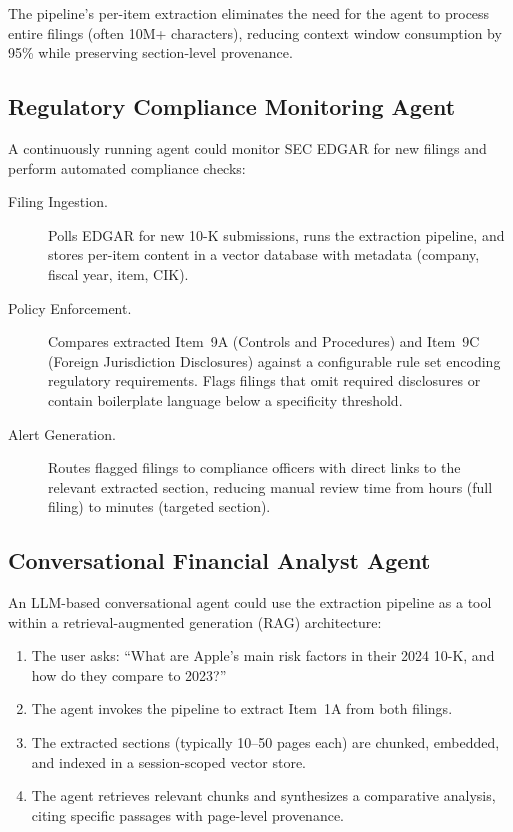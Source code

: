 \documentclass[12pt,letterpaper,oneside]{article}
\begin{document}
The pipeline's per-item extraction eliminates the need for the agent
to process entire filings (often 10M+ characters), reducing context
window consumption by 95\% while preserving section-level provenance.

\subsection{Regulatory Compliance Monitoring Agent}

A continuously running agent could monitor SEC EDGAR for new filings
and perform automated compliance checks:

\begin{description}
  \item[Filing Ingestion.]
    Polls EDGAR for new 10-K submissions, runs the extraction
    pipeline, and stores per-item content in a vector database
    with metadata (company, fiscal year, item, CIK).

  \item[Policy Enforcement.]
    Compares extracted Item~9A (Controls and Procedures) and
    Item~9C (Foreign Jurisdiction Disclosures) against a
    configurable rule set encoding regulatory requirements.
    Flags filings that omit required disclosures or contain
    boilerplate language below a specificity threshold.

  \item[Alert Generation.]
    Routes flagged filings to compliance officers with direct
    links to the relevant extracted section, reducing manual
    review time from hours (full filing) to minutes (targeted
    section).
\end{description}

\subsection{Conversational Financial Analyst Agent}

An LLM-based conversational agent could use the extraction pipeline
as a tool within a retrieval-augmented generation (RAG) architecture:

\begin{enumerate}
  \item The user asks: ``What are Apple's main risk factors in
    their 2024 10-K, and how do they compare to 2023?''
  \item The agent invokes the pipeline to extract Item~1A from
    both filings.
  \item The extracted sections (typically 10--50 pages each) are
    chunked, embedded, and indexed in a session-scoped vector store.
  \item The agent retrieves relevant chunks and synthesizes a
    comparative analysis, citing specific passages with page-level
    provenance.
\end{enumerate}
\end{document}
